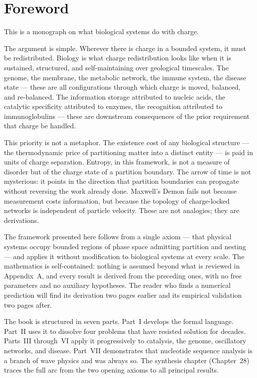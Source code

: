 
\chapter*{Foreword}

This is a monograph on what biological systems do with charge.

The argument is simple. Wherever there is charge in a bounded system, it must
be redistributed. Biology is what charge redistribution looks like when it is
sustained, structured, and self-maintaining over geological timescales. The
genome, the membrane, the metabolic network, the immune system, the disease
state --- these are all configurations through which charge is moved, balanced,
and re-balanced. The information storage attributed to nucleic acids, the
catalytic specificity attributed to enzymes, the recognition attributed to
immunoglobulins --- these are downstream consequences of the prior requirement
that charge be handled.

This priority is not a metaphor. The existence cost of any biological
structure --- the thermodynamic price of partitioning matter into a distinct
entity --- is paid in units of charge separation. Entropy, in this framework,
is not a measure of disorder but of the charge state of a partition boundary.
The arrow of time is not mysterious: it points in the direction that partition
boundaries can propagate without reversing the work already done. Maxwell's
Demon fails not because measurement costs information, but because the
topology of charge-locked networks is independent of particle velocity. These
are not analogies; they are derivations.

The framework presented here follows from a single axiom --- that physical
systems occupy bounded regions of phase space admitting partition and nesting
--- and applies it without modification to biological systems at every scale.
The mathematics is self-contained: nothing is assumed beyond what is reviewed
in Appendix~A, and every result is derived from the preceding ones, with no
free parameters and no auxiliary hypotheses. The reader who finds a numerical
prediction will find its derivation two pages earlier and its empirical
validation two pages after.

The book is structured in seven parts. Part~I develops the formal language.
Part~II uses it to dissolve four problems that have resisted solution for
decades. Parts~III through~VI apply it progressively to catalysis, the genome,
oscillatory networks, and disease. Part~VII demonstrates that nucleotide
sequence analysis is a branch of wave physics and was always so. The synthesis
chapter (Chapter~28) traces the full arc from the two opening axioms to all
principal results.

